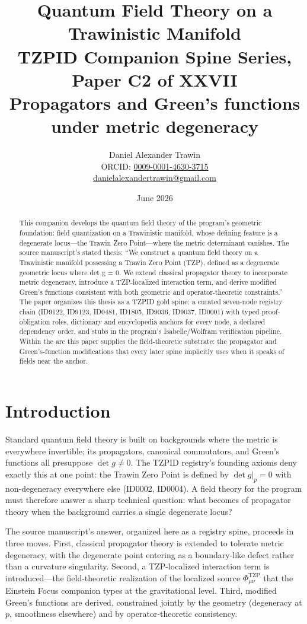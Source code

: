 \documentclass[11pt]{article}
\title{Quantum Field Theory on a Trawinistic Manifold\\[0.6em]
\large TZPID Companion Spine Series, Paper C2 of XXVII\\
\normalsize Propagators and Green's functions under metric degeneracy}
\author{Daniel Alexander Trawin\\
\small ORCID: \href{https://orcid.org/0009-0001-4630-3715}{0009-0001-4630-3715}\\
\small \href{mailto:danielalexandertrawin@gmail.com}{danielalexandertrawin@gmail.com}}
\date{June 2026}
\theoremstyle{remark}
\begin{document}
\maketitle

\begin{abstract}
This companion develops the quantum field theory of the program's geometric foundation: field quantization on a Trawinistic manifold, whose defining feature is a degenerate locus---the Trawin Zero Point---where the metric determinant vanishes.
The source manuscript's stated thesis: ``We construct a quantum field theory on a Trawinistic manifold possessing a Trawin Zero Point (TZP), defined as a degenerate geometric locus where det g = 0. We extend classical propagator theory to incorporate metric degeneracy, introduce a TZP-localized interaction term, and derive modified Green's functions consistent with both geometric and operator-theoretic constraints.'' The paper organizes this thesis as a TZPID gold spine: a curated seven-node registry chain (ID9122, ID9123, ID0481, ID1805, ID9036, ID9037, ID0001) with typed proof-obligation roles, dictionary and encyclopedia anchors for every node, a declared dependency order, and stubs in the program's Isabelle/Wolfram verification pipeline. Within the arc this paper supplies the field-theoretic substrate: the propagator and Green's-function modifications that every later spine implicitly uses when it speaks of fields near the anchor.
\end{abstract}

\section{Introduction}
\label{sec:intro}

Standard quantum field theory is built on backgrounds where the metric is everywhere invertible; its propagators, canonical commutators, and Green's functions all presuppose $\det g \neq 0$. The TZPID registry's founding axioms deny exactly this at one point: the Trawin Zero Point is defined by $\det g|_p = 0$ with non-degeneracy everywhere else (ID0002, ID0004). A field theory for the program must therefore answer a sharp technical question: what becomes of propagator theory when the background carries a single degenerate locus?

The source manuscript's answer, organized here as a registry spine, proceeds in three moves. First, classical propagator theory is extended to tolerate metric degeneracy, with the degenerate point entering as a boundary-like defect rather than a curvature singularity. Second, a TZP-localized interaction term is introduced---the field-theoretic realization of the localized source $\Phi^{\mathrm{TZP}}_{\mu\nu}$ that the Einstein Focus companion types at the gravitational level. Third, modified Green's functions are derived, constrained jointly by the geometry (degeneracy at $p$, smoothness elsewhere) and by operator-theoretic consistency.
\end{document}
